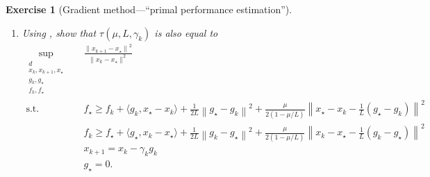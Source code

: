 \documentclass[11pt,a4paper]{article}
\newcommand{\normsq}[1]{{\left\lVert#1\right\rVert}^2}
\newcommand{\inner}[2]{{\langle #1, #2\rangle}}
\newtheorem{exercise}{Exercise}
\begin{document}
\begin{exercise}[Gradient method---``primal performance estimation'']
\begin{enumerate}
	\item Using , show that $\tau(\mu,L,\gamma_k)$ is also equal to
	\begin{equation}\label{ex1:eq:base_pep3}
		\begin{aligned}
		\sup_{\substack{d\\x_k,x_{k+1},x_\star\\g_k,g_\star\\f_k,f_\star}} \quad & \frac{{\|x_{k+1}-x_\star\|}^2}{\|x_k-x_\star\|^2}\\
		\text{s.t. } & f_\star\geqslant f_k+\inner{g_k}{x_\star-x_k}+\tfrac{1}{2L}\normsq{g_\star-g_k}+\tfrac{\mu}{2(1-\mu/L)}\normsq{x_\star-x_k-\tfrac{1}{L}(g_\star-g_k)}\\
			&f_k\geqslant f_\star+\inner{g_\star}{x_k-x_\star}+\tfrac{1}{2L}\normsq{g_k-g_\star}+\tfrac{\mu}{2(1-\mu/L)}\normsq{x_k-x_\star-\tfrac{1}{L}(g_k-g_\star)}\\
		& x_{k+1}=x_k-\gamma_k  g_k\\
		& g_\star=0.\\
		\end{aligned}
		\end{equation}
		

\end{enumerate}
\end{exercise}
\end{document}
